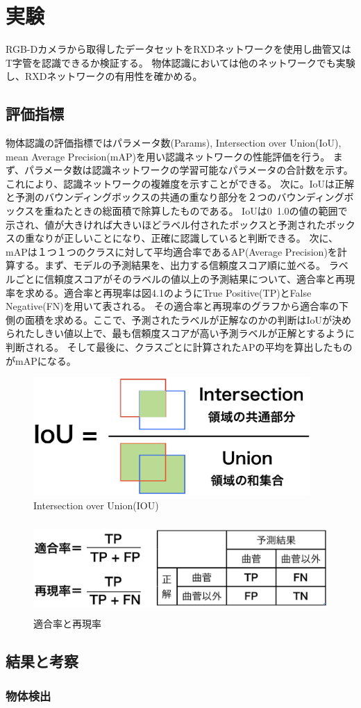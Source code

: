 ﻿\chapter{%
実験}

RGB-Dカメラから取得したデータセットをRXDネットワークを使用し曲管又はT字管を認識できるか検証する。
物体認識においては他のネットワークでも実験し、RXDネットワークの有用性を確かめる。

\section{評価指標}
物体認識の評価指標ではパラメータ数(Params), Intersection over Union(IoU), mean Average Precision(mAP)を用い認識ネットワークの性能評価を行う。
まず、パラメータ数は認識ネットワークの学習可能なパラメータの合計数を示す。これにより、認識ネットワークの複雑度を示すことができる。
次に。IoUは正解と予測のバウンディングボックスの共通の重なり部分を２つのバウンディングボックスを重ねたときの総面積で除算したものである。
IoUは0~1.0の値の範囲で示され、値が大きければ大きいほどラベル付されたボックスと予測されたボックスの重なりが正しいことになり、正確に認識していると判断できる。
次に、mAPは１つ１つのクラスに対して平均適合率であるAP(Average Precision)を計算する。まず、モデルの予測結果を、出力する信頼度スコア順に並べる。
ラベルごとに信頼度スコアがそのラベルの値以上の予測結果について、適合率と再現率を求める。適合率と再現率は図4.1のようにTrue Positive(TP)とFalse Negative(FN)を用いて表される。
その適合率と再現率のグラフから適合率の下側の面積を求める。ここで、予測されたラベルが正解なのかの判断はIoUが決められたしきい値以上で、最も信頼度スコアが高い予測ラベルが正解とするように判断される。
そして最後に、クラスごとに計算されたAPの平均を算出したものがmAPになる。

\begin{figure}[htbt]
	\centering
	 \includegraphics[height=45mm]{iou.eps}
	 \caption{Intersection over Union(IOU)}
	 \label{fig:f2}
\end{figure}

\begin{figure}[htbt]
	\centering
	 \includegraphics[height=35mm]{recall.eps}
	 \caption{適合率と再現率}
	 \label{fig:f2}
\end{figure}


\section{結果と考察}
\subsection{物体検出}

